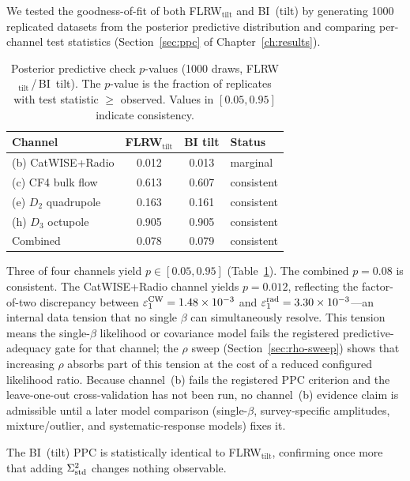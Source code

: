 We tested the goodness-of-fit of both
FLRW$_\mathrm{tilt}$ and BI~(tilt) by generating
1000 replicated datasets from the posterior predictive
distribution and comparing per-channel test statistics
(Section~\ref{sec:ppc} of Chapter~\ref{ch:results}).

\begin{table}[t]
\caption{Posterior predictive check $p$-values
  (1000 draws, FLRW$_\mathrm{tilt}$\,/\,BI~tilt).
  The $p$-value is the fraction of replicates with test
  statistic $\geq$ observed.  Values in $[0.05, 0.95]$
  indicate consistency.}
\label{tab:ppc}
\centering\small
\begin{tabular}{lccl}
\hline\hline
Channel & FLRW$_\mathrm{tilt}$ & BI tilt & Status \\
\hline
(b) CatWISE+Radio  & 0.012 & 0.013 & marginal \\
(c) CF4 bulk flow   & 0.613 & 0.607 & consistent \\
(e) $D_2$ quadrupole & 0.163 & 0.161 & consistent \\
(h) $D_3$ octupole  & 0.905 & 0.905 & consistent \\
Combined            & 0.078 & 0.079 & consistent \\
\hline\hline
\end{tabular}
\end{table}

Three of four channels yield $p \in [0.05, 0.95]$
(Table~\ref{tab:ppc}).  The combined $p = 0.08$ is
consistent.  The CatWISE+Radio channel yields $p = 0.012$,
reflecting the factor-of-two discrepancy between
$\varepsilon_1^{\mathrm{CW}} = 1.48 \times 10^{-3}$ and
$\varepsilon_1^{\mathrm{rad}} = 3.30 \times 10^{-3}$---an internal
data tension that no single $\beta$ can simultaneously resolve.
This tension means the single-$\beta$ likelihood or covariance
model fails the registered predictive-adequacy gate for that
channel; the $\rho$ sweep (Section~\ref{sec:rho-sweep}) shows
that increasing $\rho$ absorbs part of this tension at the cost
of a reduced configured likelihood ratio.  Because channel~(b)
fails the registered PPC criterion and the leave-one-out
cross-validation has not been run, no channel~(b) evidence claim
is admissible until a later model comparison (single-$\beta$,
survey-specific amplitudes, mixture/outlier, and
systematic-response models) fixes it.

The BI~(tilt) PPC is statistically identical to
FLRW$_\mathrm{tilt}$, confirming once more that adding $\Sigma^2_{\mathrm{std}}$
changes nothing observable.


